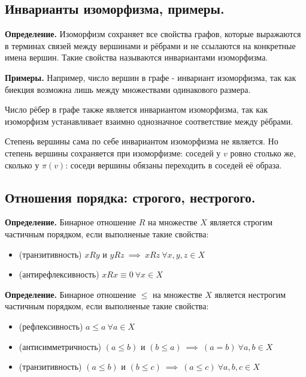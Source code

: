 \documentclass[a4paper, 10pt]{article}
\begin{document}
\subsection{Инварианты изоморфизма, примеры.}

\textbf{Определение.} Изоморфизм сохраняет все свойства графов, которые выражаются в терминах связей между вершинами и рёбрами и не ссылаются на конкретные имена вершин. Такие свойства называются инвариантами изоморфизма.

\textbf{Примеры.} Например, число вершин в графе - инвариант изоморфизма, так как биекция возможна лишь между множествами одинакового размера.

Число рёбер в графе также является инвариантом изоморфизма, так как изоморфизм устанавливает взаимно однозначное соответствие между рёбрами.

Степень вершины сама по себе инвариантом изоморфизма не является. Но степень вершины сохраняется при изоморфизме: соседей у $v$ ровно столько же, сколько
у $\pi(v)$: соседи вершины обязаны переходить в соседей её образа.

\subsection{Отношения порядка: строгого, нестрогого.}

\textbf{Определение.} Бинарное отношение $R$ на множестве $X$ является строгим частичным порядком, если выполненые такие свойства:

\begin{itemize}
    \item (транзитивность) $xRy$ и $yRz \ \implies \ xRz \ \forall x, y, z \in X$
    \item (антирефлексивность) $xRx \equiv 0 \ \forall x \in X$
\end{itemize}

\textbf{Определение.} Бинарное отношение $\leqslant$ на множестве $X$ является нестрогим частичным порядком, если выполненые такие свойства:

\begin{itemize}
    \item (рефлексивность) $a \leqslant a \ \forall a \in X$
    \item (антисимметричность) $(a \leqslant b)$ и $(b \leqslant a) \ \implies \ (a = b) \ \forall a, b \in X$
    \item (транзитивность) $(a \leqslant b)$ и $(b \leqslant c) \ \implies \ (a \leqslant c) \ \forall a, b, c \in X $
\end{itemize}
\end{document}
